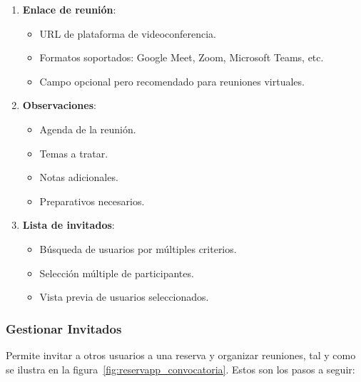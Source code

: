 \begin{enumerate}
   \item \textbf{Enlace de reunión}:
   \begin{itemize}
      \item URL de plataforma de videoconferencia.
      \item Formatos soportados: Google Meet, Zoom, Microsoft Teams, etc.
	  \item Campo opcional pero recomendado para reuniones virtuales.
   \end{itemize}
   \item \textbf{Observaciones}:
   \begin{itemize}
      \item Agenda de la reunión.
      \item Temas a tratar.
      \item Notas adicionales.
      \item Preparativos necesarios.
   \end{itemize}
   \item \textbf{Lista de invitados}:
   \begin{itemize}
      \item Búsqueda de usuarios por múltiples criterios.
      \item Selección múltiple de participantes.
      \item Vista previa de usuarios seleccionados.
   \end{itemize}
\end{enumerate}

\subsubsection{Gestionar Invitados}
Permite invitar a otros usuarios a una reserva y organizar reuniones, tal y como se ilustra en la figura~\ref{fig:reservapp_convocatoria}. Estos son los pasos a seguir:

